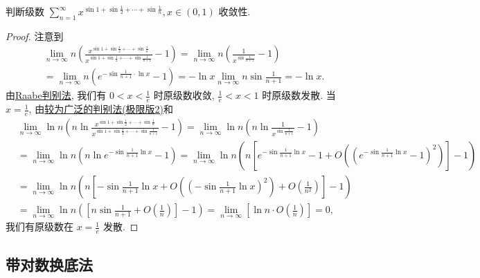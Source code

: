 \documentclass[../../main.tex]{subfiles}%
\begin{document}
\begin{example}
判断级数 $\sum_{n=1}^{\infty} x^{\sin 1 + \sin \frac{1}{2} + \cdots + \sin \frac{1}{n}}, x \in (0,1)$ 收敛性.
\end{example}
\begin{proof}
注意到
\begin{align*}
&\lim_{n \to \infty} n \left( \frac{x^{\sin 1 + \sin \frac{1}{2} + \cdots + \sin \frac{1}{n}}}{x^{\sin 1 + \sin \frac{1}{2} + \cdots + \sin \frac{1}{n+1}}} - 1 \right) = \lim_{n \to \infty} n \left( \frac{1}{x^{\sin \frac{1}{n+1}}} - 1 \right) \\
&= \lim_{n \to \infty} n \left( e^{-\sin \frac{1}{n+1} \cdot \ln x} - 1 \right) = -\ln x \lim_{n \to \infty} n \sin \frac{1}{n+1} = -\ln x.
\end{align*}
由\hyperref[theorem:Raabe(拉比)判别法]{Raabe判别法}, 我们有 $0 < x < \frac{1}{e}$ 时原级数收敛, $\frac{1}{e} < x < 1$ 时原级数发散. 当 $x = \frac{1}{e}$, 由\hyperref[theorem:较为广泛的判别法]{较为广泛的判别法(极限版2)}和
\begin{align*}
&\lim_{n \to \infty} \ln n \left( n \ln \frac{x^{\sin 1 + \sin \frac{1}{2} + \cdots + \sin \frac{1}{n}}}{x^{\sin 1 + \sin \frac{1}{2} + \cdots + \sin \frac{1}{n+1}}} - 1 \right) = \lim_{n \to \infty} \ln n \left( n \ln \frac{1}{x^{\sin \frac{1}{n+1}}} - 1 \right) \\
&= \lim_{n \to \infty} \ln n \left( n \ln e^{-\sin \frac{1}{n+1} \ln x} - 1 \right) = \lim_{n \to \infty} \ln n \left( n \left[ e^{-\sin \frac{1}{n+1} \ln x} - 1 + O \left( \left( e^{-\sin \frac{1}{n+1} \ln x} - 1 \right)^2 \right) \right] - 1 \right) \\
&= \lim_{n \to \infty} \ln n \left( n \left[ -\sin \frac{1}{n+1} \ln x + O \left( \left( -\sin \frac{1}{n+1} \ln x \right)^2 \right) + O \left( \frac{1}{n^2} \right) \right] - 1 \right) \\
&= \lim_{n \to \infty} \ln n \left( \left[ n \sin \frac{1}{n+1} + O \left( \frac{1}{n} \right) \right] - 1 \right) = \lim_{n \to \infty} \left[ \ln n \cdot O \left( \frac{1}{n} \right) \right] = 0,
\end{align*}
我们有原级数在 $x = \frac{1}{e}$ 发散.
\end{proof}



\subsection{带对数换底法}
\end{document}
